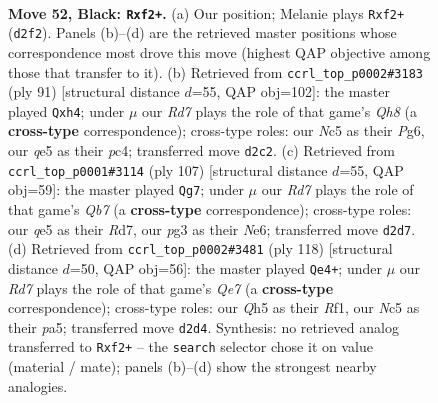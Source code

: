 \documentclass[11pt]{article}
\begin{document}
\clearpage

\begin{figure}[p]\centering
\begin{subfigure}{0.46\textwidth}\centering
\resizebox{\linewidth}{!}{%
\newchessgame
\chessboard[
  setfen={6k1/p7/1p6/2n1Qp1q/P1p5/6P1/1P1r1RK1/R7 b - - 3 52},
  showmover=false,
  pgfstyle=straightmove, color=movearrow, markmove={d2-f2}
]}
\caption{}
\end{subfigure}\hfill
\begin{subfigure}{0.46\textwidth}\centering
\resizebox{\linewidth}{!}{%
\newchessgame
\chessboard[
  setfen={8/5p1k/6p1/3p2P1/2P4P/4P3/r1R1KP2/3Q3q b - - 7 46},
  showmover=false,
  pgfstyle=straightmove, color=movearrow, markmove={h1-h4}
]}
\caption{}
\end{subfigure}
\\[4pt]
\begin{subfigure}{0.46\textwidth}\centering
\resizebox{\linewidth}{!}{%
\newchessgame
\chessboard[
  setfen={5k2/3r1p2/4n3/p2N4/P6Q/1P1p2P1/1q3RK1/8 b - - 35 54},
  showmover=false,
  pgfstyle=straightmove, color=movearrow, markmove={b2-g7}
]}
\caption{}
\end{subfigure}\hfill
\begin{subfigure}{0.46\textwidth}\centering
\resizebox{\linewidth}{!}{%
\newchessgame
\chessboard[
  setfen={8/4Q1rk/1p5p/p7/2P2p2/1P4qP/P7/5R1K w - - 36 60},
  showmover=false,
  pgfstyle=straightmove, color=movearrow, markmove={e7-e4}
]}
\caption{}
\end{subfigure}
\caption{\textbf{Move 52, Black: \texttt{Rxf2+}.} (a) Our position; Melanie plays \texttt{Rxf2+} (\texttt{d2f2}). Panels (b)--(d) are the retrieved master positions whose correspondence most drove this move (highest QAP objective among those that transfer to it). (b) Retrieved from \texttt{ccrl\_top\_p0002\#3183} (ply 91) [structural distance $d$=55, QAP obj=102]: the master played \texttt{Qxh4}; under $\mu$ our \emph{Rd7} plays the role of that game's \emph{Qh8} (a \textbf{cross-type} correspondence); cross-type roles: our \emph{N}c5 as their \emph{P}g6, our \emph{q}e5 as their \emph{p}c4; transferred move \texttt{d2c2}. (c) Retrieved from \texttt{ccrl\_top\_p0001\#3114} (ply 107) [structural distance $d$=55, QAP obj=59]: the master played \texttt{Qg7}; under $\mu$ our \emph{Rd7} plays the role of that game's \emph{Qb7} (a \textbf{cross-type} correspondence); cross-type roles: our \emph{q}e5 as their \emph{R}d7, our \emph{p}g3 as their \emph{N}e6; transferred move \texttt{d2d7}. (d) Retrieved from \texttt{ccrl\_top\_p0002\#3481} (ply 118) [structural distance $d$=50, QAP obj=56]: the master played \texttt{Qe4+}; under $\mu$ our \emph{Rd7} plays the role of that game's \emph{Qe7} (a \textbf{cross-type} correspondence); cross-type roles: our \emph{Q}h5 as their \emph{R}f1, our \emph{N}c5 as their \emph{p}a5; transferred move \texttt{d2d4}. Synthesis: no retrieved analog transferred to \texttt{Rxf2+} -- the \texttt{search} selector chose it on value (material / mate); panels (b)--(d) show the strongest nearby analogies.}
\label{fig:thought-m103}
\end{figure}
\end{document}
